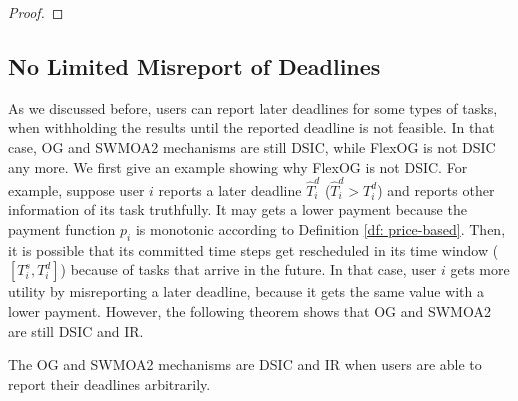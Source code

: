 \documentclass[11pt]{phdthesis}
\begin{document}
\begin{proof}
\end{proof}
\subsection{No Limited Misreport of Deadlines} \label{late deadline}
As we discussed before, users can report later deadlines for some types of tasks, when withholding the results until the reported deadline is not feasible. In that case, OG and SWMOA2 mechanisms are still DSIC, while FlexOG is not DSIC any more. We first give an example showing why FlexOG is not DSIC. For example, suppose user $ i $ reports a later deadline $ \hat{T}_i^d $ ($ \hat{T}_i^d > T_i^d $) and reports other information of its task truthfully. It may gets a lower payment because the payment function $ p_i $ is monotonic according to Definition \ref{df: price-based}. Then, it is possible that its committed time steps get rescheduled in its time window ($ [T_i^s, T_i^d] $) because of tasks that arrive in the future. In that case, user $ i $ gets more utility by misreporting a later deadline, because it gets the same value with a lower payment. However, the following theorem shows that OG and SWMOA2 are still DSIC and IR. 
\begin{theorem} \label{th: arbitary misreport of deadlines}
   The OG and SWMOA2 mechanisms are DSIC and IR when users are able to report their deadlines arbitrarily. 
\end{theorem}
\end{document}
